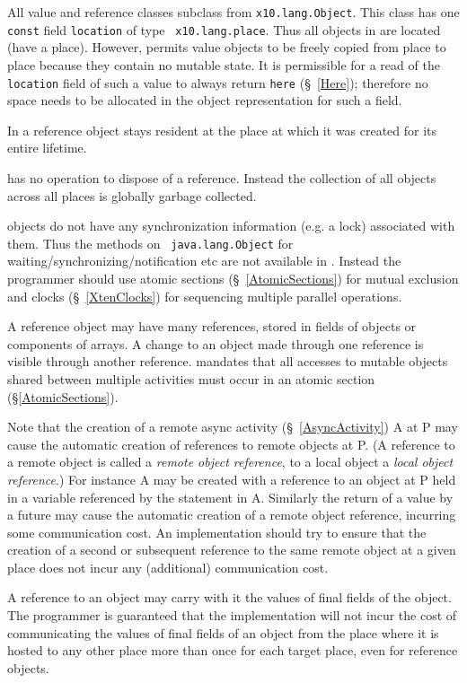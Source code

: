All value and reference classes subclass from {\tt x10.lang.Object}.
This class has one {\tt const} field {\tt location} of type {\tt
x10.lang.place}.  Thus all objects in \Xten{}
are located (have a place). However, \Xten{} permits value objects to
be freely copied from place to place because they contain no mutable
state.  It is permissible for a read of the {\tt location} field of
such a value to always return {\tt here} (\S~\ref{Here});
therefore no space needs to be allocated in the object representation
for such a field.

In \XtenCurrVer{} a reference object stays resident at the place at
which it was created for its entire lifetime.

{}\Xten{} has no operation to dispose of a reference.  Instead the
collection of all objects across all places is globally garbage
collected.

{}\Xten{} objects do not have any synchronization information (e.g.{}
a lock) associated with them. Thus the methods on {\tt
java.lang.Object} for waiting/synchronizing/notification etc are not
available in \Xten. Instead the programmer should use atomic sections
(\S~\ref{AtomicSections}) for mutual exclusion and clocks
(\S~\ref{XtenClocks}) for sequencing multiple parallel operations.

A reference object may have many references, stored in fields of
objects or components of arrays. A change to an object made through
one reference is visible through another reference. \Xten{} mandates
that all accesses to mutable objects shared between multiple
activities must occur in an atomic section (\S\ref{AtomicSections}).

Note that the creation of a remote async activity
(\S~\ref{AsyncActivity}) {\cf A} at {\cf P} may cause the automatic creation of
references to remote objects at {\cf P}. (A reference to a remote
object is called a {\em remote object reference}, to a local object a
{\em local object reference}.)  For instance {\cf A} may be created
with a reference to an object at {\cf P} held in a variable referenced
by the statement in {\cf A}.  Similarly the return of a value by a
{\cf future} may cause the automatic creation of a remote object
reference, incurring some communication cost.  An {}\Xten{}
implementation should try to ensure that the creation of a second or
subsequent reference to the same remote object at a given place does
not incur any (additional) communication cost.

A reference to an object may carry with it the values of final fields
of the object. The programmer is guaranteed that the implementation
will not incur the cost of communicating the values of final fields of
an object from the place where it is hosted to any other place more
than once for each target place, even for reference objects.

